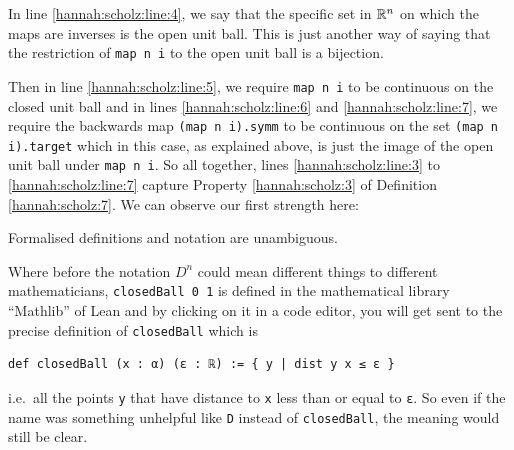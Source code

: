 In line \ref{hannah:scholz:line:4}, we say that the specific set in $\mathbb R^n$ on which the maps are inverses is the open unit ball. This is just another way of saying that the restriction of \lstinline[language=lean]|map n i| to the open unit ball is a bijection. 

Then in line \ref{hannah:scholz:line:5}, we require \lstinline[language=lean]|map n i| to be continuous on the closed unit ball and in lines \ref{hannah:scholz:line:6} and \ref{hannah:scholz:line:7}, we require the backwards map \lstinline[language=lean]|(map n i).symm| to be continuous on the set \lstinline[language=lean]|(map n i).target| which in this case, as explained above, is just the image of the open unit ball under \lstinline[language=lean]|map n i|. So all together, lines \ref{hannah:scholz:line:3} to \ref{hannah:scholz:line:7} capture Property \ref{hannah:scholz:3} of Definition \ref{hannah:scholz:7}. We can observe our first strength here: 

\begin{strength}\label{hannah:scholz:strength:1}
    Formalised definitions and notation are unambiguous. 
\end{strength}

Where before the notation $D^n$ could mean different things to different mathematicians, \lstinline[language=lean]|closedBall 0 1| is defined in the mathematical library ``Mathlib'' of Lean and by clicking on it in a code editor, you will get sent to the precise definition of \lstinline[language=lean]|closedBall| which is

\begin{lstlisting}[language=lean, numbers=none]
def closedBall (x : α) (ε : ℝ) := { y | dist y x ≤ ε }
\end{lstlisting}

i.e.\ all the points \lstinline[language=lean]|y| that have distance to \lstinline[language=lean]|x| less than or equal to \lstinline[language=lean]|ε|. So even if the name was something unhelpful like \lstinline[language=lean]|D| instead of \lstinline[language=lean]|closedBall|, the meaning would still be clear.



